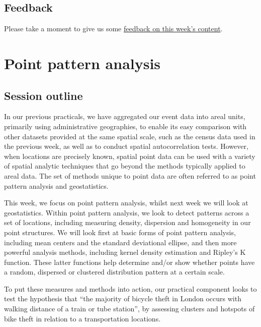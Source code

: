 \documentclass[
]{book}
\begin{document}
\hypertarget{feedback}{%
\section{Feedback}\label{feedback}}

Please take a moment to give us some \href{https://forms.gle/BYbZySVSHeoUEkJh9}{feedback on this week's content}.

\hypertarget{point-pattern-analysis}{%
\chapter{Point pattern analysis}\label{point-pattern-analysis}}

\hypertarget{session-outline}{%
\section{Session outline}\label{session-outline}}

In our previous practicals, we have aggregated our event data into areal units, primarily using administrative geographies, to enable its easy comparison with other datasets provided at the same spatial scale, such as the census data used in the previous week, as well as to conduct spatial autocorrelation tests. However, when locations are precisely known, spatial point data can be used with a variety of spatial analytic techniques that go beyond the methods typically applied to areal data. The set of methods unique to point data are often referred to as point pattern analysis and geostatistics.

This week, we focus on point pattern analysis, whilst next week we will look at geostatistics. Within point pattern analysis, we look to detect patterns across a set of locations, including measuring density, dispersion and homogeneity in our point structures. We will look first at basic forms of point pattern analysis, including mean centers and the standard deviational ellipse, and then more powerful analysis methods, including kernel density estimation and Ripley's K function. These latter functions help determine and/or show whether points have a random, dispersed or clustered distribution pattern at a certain scale.

To put these measures and methods into action, our practical component looks to test the hypothesis that ``the majority of bicycle theft in London occurs with walking distance of a train or tube station'', by assessing clusters and hotspots of bike theft in relation to a transportation locations.
\end{document}
